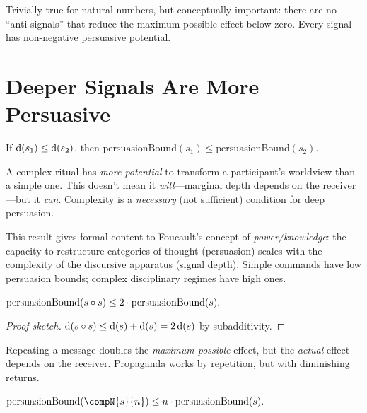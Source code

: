 Trivially true for natural numbers, but conceptually important: there are
no ``anti-signals'' that reduce the maximum possible effect below zero.
Every signal has non-negative persuasive potential.


\section{Deeper Signals Are More Persuasive}
\label{sec:pers-monotonicity}

\begin{theorem}
\label{thm:persuasion-mono}
If $\operatorname{d}(s_1) \le \operatorname{d}(s_2)$, then
$\mathrm{persuasionBound}(s_1) \le \mathrm{persuasionBound}(s_2)$.
\end{theorem}

A complex ritual has \emph{more potential} to transform a participant's
worldview than a simple one.  This doesn't mean it \emph{will}---marginal
depth depends on the receiver---but it \emph{can}.  Complexity is a
\emph{necessary} (not sufficient) condition for deep persuasion.

This result gives formal content to Foucault's concept of
\emph{power/knowledge}: the capacity to restructure categories of thought
(persuasion) scales with the complexity of the discursive apparatus
(signal depth).  Simple commands have low persuasion bounds; complex
disciplinary regimes have high ones.

\begin{theorem}
\label{thm:self-compose-persuasion}
$\mathrm{persuasionBound}(s\circ s) \le 2\cdot\mathrm{persuasionBound}(s).$
\end{theorem}

\begin{proof}[Proof sketch]
$\operatorname{d}(s\circ s)\le \operatorname{d}(s)+\operatorname{d}(s) = 2\operatorname{d}(s)$ by subadditivity.
\end{proof}

Repeating a message doubles the \emph{maximum possible} effect, but the
\emph{actual} effect depends on the receiver.  Propaganda works by
repetition, but with diminishing returns.

\begin{theorem}
\label{thm:composeN-persuasion}
$\mathrm{persuasionBound}(\compN{s}{n}) \le n\cdot\mathrm{persuasionBound}(s).$
\end{theorem}


